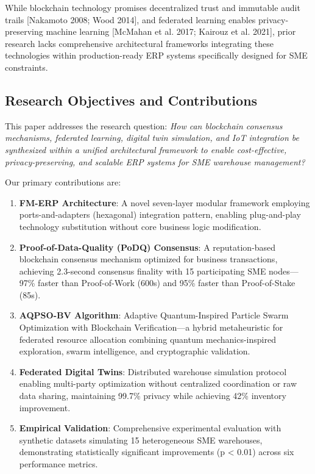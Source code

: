 \documentclass[times,10pt,twocolumn]{jucs2e}
\begin{document}
While blockchain technology promises decentralized trust and immutable audit trails [Nakamoto 2008; Wood 2014], and federated learning enables privacy-preserving machine learning [McMahan et al. 2017; Kairouz et al. 2021], prior research lacks comprehensive architectural frameworks integrating these technologies within production-ready ERP systems specifically designed for SME constraints.

\subsection{Research Objectives and Contributions}

This paper addresses the research question: \textit{How can blockchain consensus mechanisms, federated learning, digital twin simulation, and IoT integration be synthesized within a unified architectural framework to enable cost-effective, privacy-preserving, and scalable ERP systems for SME warehouse management?}

Our primary contributions are:

\begin{enumerate}
\item \textbf{FM-ERP Architecture}: A novel seven-layer modular framework employing ports-and-adapters (hexagonal) integration pattern, enabling plug-and-play technology substitution without core business logic modification.

\item \textbf{Proof-of-Data-Quality (PoDQ) Consensus}: A reputation-based blockchain consensus mechanism optimized for business transactions, achieving 2.3-second consensus finality with 15 participating SME nodes—97\% faster than Proof-of-Work (600s) and 95\% faster than Proof-of-Stake (85s).

\item \textbf{AQPSO-BV Algorithm}: Adaptive Quantum-Inspired Particle Swarm Optimization with Blockchain Verification—a hybrid metaheuristic for federated resource allocation combining quantum mechanics-inspired exploration, swarm intelligence, and cryptographic validation.

\item \textbf{Federated Digital Twins}: Distributed warehouse simulation protocol enabling multi-party optimization without centralized coordination or raw data sharing, maintaining 99.7\% privacy while achieving 42\% inventory improvement.

\item \textbf{Empirical Validation}: Comprehensive experimental evaluation with synthetic datasets simulating 15 heterogeneous SME warehouses, demonstrating statistically significant improvements (p < 0.01) across six performance metrics.
\end{enumerate}
\end{document}
